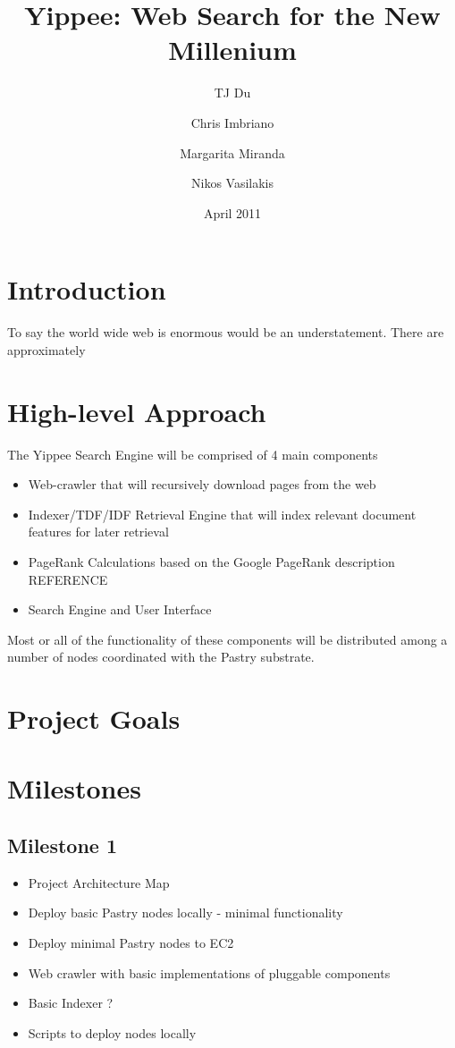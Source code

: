 \documentclass[11pt, onecolumn]{article}
\begin{document}
\title{Yippee: Web Search for the New Millenium}
\author{	TJ Du
	\and Chris Imbriano
	\and Margarita Miranda
	\and Nikos Vasilakis}
\date{April 2011}

\maketitle

\section{ Introduction }

To say the world wide web is enormous would be an understatement.  There are approximately 

\section{ High-level Approach }

The Yippee Search Engine will be comprised of 4 main components
\begin{itemize}
\item Web-crawler that will recursively download pages from the web
\item Indexer/TDF/IDF Retrieval Engine that will index relevant document features for later retrieval 
\item PageRank Calculations based on the Google PageRank description REFERENCE
\item Search Engine and User Interface
\end{itemize}

Most or all of the functionality of these components will be distributed among a number of nodes coordinated with the Pastry substrate.

\section{ Project Goals }

\section{ Milestones }

\subsection{Milestone 1}

\begin{itemize}
\item            Project Architecture Map
\item            Deploy basic Pastry nodes locally - minimal functionality
\item            Deploy minimal Pastry nodes to EC2
\item            Web crawler with basic implementations of pluggable components
\item            Basic Indexer ?
\item            Scripts to deploy nodes locally 
\end{itemize}
\end{document}

